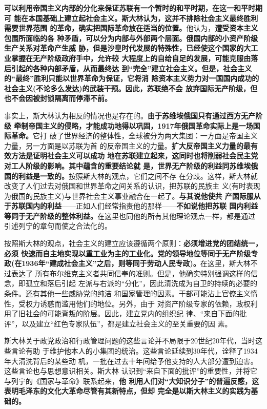 \textbf{可以利用帝国主义内部的分化来保证苏联有一个暂时的和平时期，在这一和平时期可
  能在本国基础上建立起社会主义。斯大林认为，这并不排除社会主义最终胜利需要世界范围
  的革命，确实把国际革命放在适当的位置。}他认为，\textbf{遭受资本主义包围所面临的各
  种矛盾，可以分为内部与外部两个层面。俄国内部的小资产阶级生产关系对革命产生威
  胁，但是沙皇时代发展的特殊性，已经使这个国家的大工业掌握在无产阶级政府手中，允许较
  大程度上的自给自足的发展，可能克服由落后引起的各种内部矛盾，从而最终达
  到“完全”建立社会主义。但是，社会主义的“最终”胜利只能以世界革命为保证，它将消
  除资本主义势力对一国国内成功的社会主义(不论多么发达)的武装干预。因此，苏联绝不会
  放弃国际无产阶级，但也不会因被封锁隔离而停滞不前。}

事实上，斯大林认为相反的情况也是存在的。\textbf{由于苏维埃俄国只有通过西方无产阶级
  牵制帝国主义的侵略，才能成功地得以巩固，1917年俄国革命实际上是一场国际革命。}它打
破了世界经济的整体性，全球被分为两大集团：一方面是帝国主义力量，另一方面是以苏联为首
的反帝国主义的力量。\textbf{扩大反帝国主义力量的最有效方法是证明社会主义可以成功
  地在苏联建立起来，这同时也将削弱社会民主党对工人阶级的影响。其中蕴含的重要结论就
  是，世界无产阶级的利益同苏维埃俄国的利益是一致的。}按照斯大林的观点，它们之间不存
在分歧。这样，斯大林就改变了人们过去对俄国和世界革命之间关系的认识，把苏联的民族主
义(有时表现为俄国的民族主义)与世界社会主义事业融合在一起了。\textbf{与其说他使共
  产国际服从于苏联国内的利益}——正如人们经常指责他的那样——\textbf{不如说他把苏联
  国内利益等同于无产阶级的整体利益。}在这里也同他的所有其他理论观点一样，都是通过
引述列宁的章句而使之合法化的。

按照斯大林的观点，社会主义的建立应该遵循两个原则：\textbf{必须增进党的团结统一，必须
  快速而自主地实现以重工业为主的工业化。党的领导地位等同于无产阶级专
  政(在1936年“建成社会主义”之后，则等同于劳动人民专政)。}在这里，斯大林不过表达了
所有布尔维克主义者共同信奉的准则。但是，他确实特别强调这样的信念，即孤立和落后引起
左派与右派的“分化”，因此清洗成为自卫的持续的必要的条件。还有其他一些威胁党的纯洁
和国家管理的因素。干部可能沾上官僚主义惰性，受权力诱惑而滥用他们的地位。另外，由于
对资产阶级专家的依赖，政权利用了旧社会的可能背叛的阶层。因此，建立党内的组织纪
律、“来自下面的批评”，以及建立“红色专家队伍”，都是建立社会主义的至关重要的因
素。

斯大林关于政党政治和行政管理问题的这些言论并不局限于20世纪20年代，当时这些言论有助
于维护他本人的小集团的统治。这些言论延续到30年代，诠释了1934年大清洗背后的某些动
机，一批在过去十年间给予他支持的人大部分遭到迫害。这些言论也与思想意识相关。斯大林
认识到“来自下面的批评”的重要性，并将它与列宁的《国家与革命》联系起来，\textbf{他
  利用人们对“大知识分子”的普遍反感，这表明毛泽东的文化大革命尽管有其新特点，但却
  完全是以斯大林主义的实践为基础的。}

